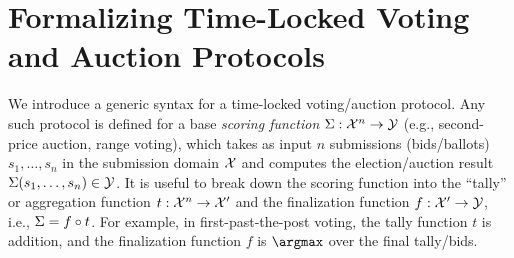 \section{Formalizing Time-Locked Voting and Auction Protocols}\label{sec:syntax}

We introduce a generic syntax for a time-locked voting/auction protocol. Any such protocol is defined for a base \emph{scoring function} $\Sigma: \mathcal{X}^n \to \mathcal{Y}$ (e.g., second-price auction, range voting), which takes as input $n$ submissions (bids/ballots) $s_1, \dots, s_n$ in the submission domain $\mathcal{X}$ and computes the election/auction result $\Sigma(s_1, \dots, s_n) \in \mathcal{Y}$. It is useful to break down the scoring function into the ``tally'' or aggregation function $t: \mathcal{X}^n \to \mathcal{X}'$ and the finalization function $f: \mathcal{X}' \to \mathcal{Y}$, i.e., $\Sigma = f \circ t$.
For example, in first-past-the-post voting, the tally function $t$ is addition, and the finalization function $f$ is $\argmax$ over the final tally/bids.


